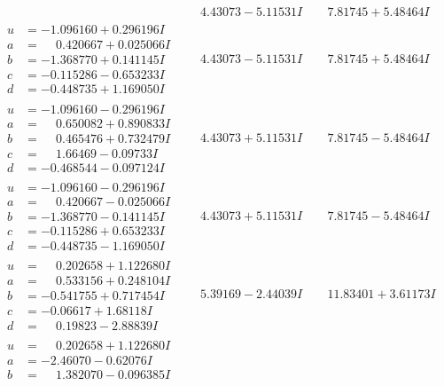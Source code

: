 \documentclass[1p]{elsarticle_modified}
\theoremstyle{definition}
\begin{document}
$$\begin{array}{c|c|c}
 & \phantom{-}4.43073 - 5.11531 I & \phantom{-}7.81745 + 5.48464 I \\ \hline\begin{aligned}
u &= -1.096160 + 0.296196 I \\
a &= \phantom{-}0.420667 + 0.025066 I \\
b &= -1.368770 + 0.141145 I \\
c &= -0.115286 - 0.653233 I \\
d &= -0.448735 + 1.169050 I\end{aligned}
 & \phantom{-}4.43073 - 5.11531 I & \phantom{-}7.81745 + 5.48464 I \\ \hline\begin{aligned}
u &= -1.096160 - 0.296196 I \\
a &= \phantom{-}0.650082 + 0.890833 I \\
b &= \phantom{-}0.465476 + 0.732479 I \\
c &= \phantom{-}1.66469 - 0.09733 I \\
d &= -0.468544 - 0.097124 I\end{aligned}
 & \phantom{-}4.43073 + 5.11531 I & \phantom{-}7.81745 - 5.48464 I \\ \hline\begin{aligned}
u &= -1.096160 - 0.296196 I \\
a &= \phantom{-}0.420667 - 0.025066 I \\
b &= -1.368770 - 0.141145 I \\
c &= -0.115286 + 0.653233 I \\
d &= -0.448735 - 1.169050 I\end{aligned}
 & \phantom{-}4.43073 + 5.11531 I & \phantom{-}7.81745 - 5.48464 I \\ \hline\begin{aligned}
u &= \phantom{-}0.202658 + 1.122680 I \\
a &= \phantom{-}0.533156 + 0.248104 I \\
b &= -0.541755 + 0.717454 I \\
c &= -0.06617 + 1.68118 I \\
d &= \phantom{-}0.19823 - 2.88839 I\end{aligned}
 & \phantom{-}5.39169 - 2.44039 I & \phantom{-}11.83401 + 3.61173 I \\ \hline\begin{aligned}
u &= \phantom{-}0.202658 + 1.122680 I \\
a &= -2.46070 - 0.62076 I \\
b &= \phantom{-}1.382070 - 0.096385 I \\

\end{aligned}
\end{array}$$
\end{document}
